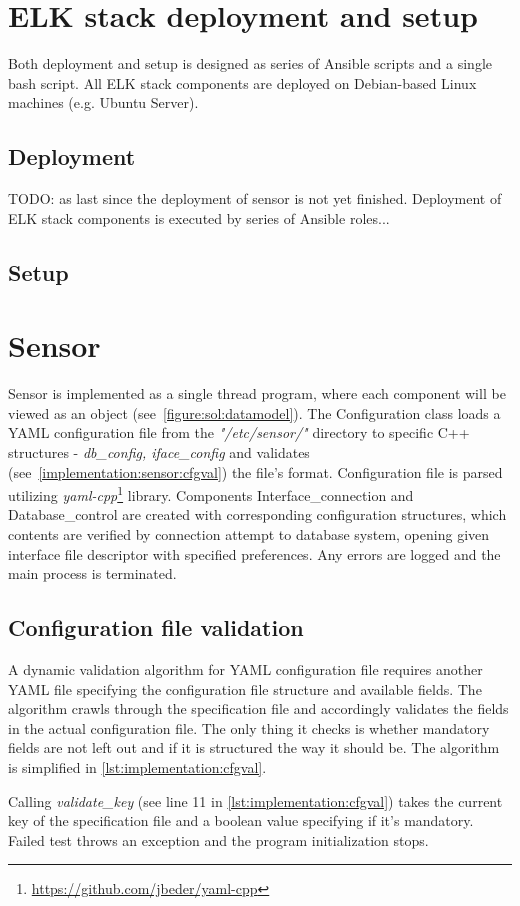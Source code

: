 \documentclass[12pt,a4paper,twoside]{report}
\begin{document}
	\section{ELK stack deployment and setup} \label{implementation:elk}
		Both deployment and setup is designed as series of Ansible scripts and a single bash script. All ELK stack components are deployed on Debian-based Linux machines (e.g. Ubuntu Server).
		\subsection{Deployment} \label{implementation:elk:deploy}
			TODO: as last since the deployment of sensor is not yet finished.
			Deployment of ELK stack components is executed by series of Ansible roles...
		\subsection{Setup} \label{implementation:elk:setup}
			
	\section{Sensor} \label{implementation:sensor}
		Sensor is implemented as a single thread program, where each component will be viewed as an object (see~\autoref{figure:sol:datamodel}). The Configuration class loads a YAML configuration file from the \emph{"/etc/sensor/"} directory to specific C++ structures - \emph{db\_config, iface\_config} and validates (see~\autoref{implementation:sensor:cfgval}) the file's format. Configuration file is parsed utilizing \emph{yaml-cpp}\footnote{\url{https://github.com/jbeder/yaml-cpp}} library. Components Interface\_connection and Database\_control are created with corresponding configuration structures, which contents are verified by connection attempt to database system, opening given interface file descriptor with specified preferences. Any errors are logged and the main process is terminated.
		\subsection{Configuration file validation} \label{implementation:sensor:cfgval}
			A dynamic validation algorithm for YAML configuration file requires another YAML file specifying the configuration file structure and available fields. The algorithm crawls through the specification file and accordingly validates the fields in the actual configuration file. The only thing it checks is whether mandatory fields are not left out and if it is structured the way it should be. The algorithm is simplified in \autoref{lst:implementation:cfgval}.
			
			Calling \emph{validate\_key} (see line 11 in \autoref{lst:implementation:cfgval}) takes the current key of the specification file and a boolean value specifying if it's mandatory. Failed test throws an exception and the program initialization stops. 
\end{document}
